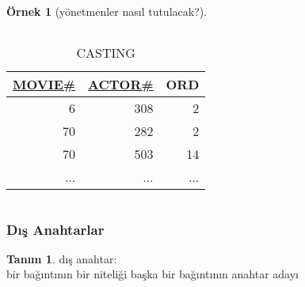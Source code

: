\documentclass[dvipsnames]{beamer}
\theoremstyle{definition}
\newtheorem{tanim}[theorem]{Tanım}
\theoremstyle{example}
\newtheorem{ornek}[theorem]{Örnek}
\theoremstyle{plain}
\begin{document}
\begin{frame}
\begin{ornek}[yönetmenler nasıl tutulacak?]
\begin{columns}[t]
      \begin{tiny}
      \begin{table}
        \caption{CASTING}
        \begin{tabular}{|r|r|r|}\hline
\underline{MOVIE\#} & \underline{ACTOR\#} & ORD\\[2pt]\hline\hline
                  6 &                 308 &   2\\\hline
                 70 &                 282 &   2\\\hline
                 70 &                 503 &  14\\\hline
                ... &                 ... & ...\\\hline
        \end{tabular}
      \end{table}
      \end{tiny}
    \end{columns}
  \end{ornek}
\end{frame}

\begin{frame}
  \frametitle{Dış Anahtarlar}

  \begin{tanim}
    \alert{dış anahtar}:\\
      bir bağıntının bir niteliği başka bir bağıntının anahtar adayı
  \end{tanim}
\end{frame}
\end{document}
